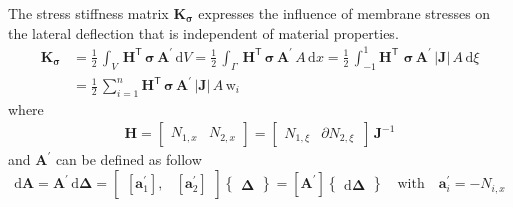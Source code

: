 The stress stiffness matrix $\mathbf{K}_{\boldsymbol{\sigma}}$ expresses the influence of membrane stresses on the lateral deflection that is independent of material properties.
\begin{equation}
\begin{aligned}
\mathbf{K}_{\boldsymbol{\sigma}} & = \frac{1}{2} \, \int_{V} \, \mathbf{H}^{\mathsf{T}} \, \boldsymbol{\sigma} \, \mathbf{A}^{'} \, \mathrm{d} V = \frac{1}{2} \, \int_{\Gamma} \, \mathbf{H}^{\mathsf{T}} \, \boldsymbol{\sigma} \, \mathbf{A}^{'} \, A \, \mathrm{d} x 
= \frac{1}{2} \, \int_{-1}^{1} \mathbf{H}^{\mathsf{T}} \,  \, \boldsymbol{\sigma} \, \mathbf{A}^{'} \, |\mathbf{J}|  \, A \,  \mathrm{d} \xi\\
& = \frac{1}{2} \, \sum_{i=1}^{n}  \mathbf{H}^{\mathsf{T}} \, \boldsymbol{\sigma} \, \mathbf{A}^{'}  \, |\mathbf{J}| \, A \, \mathrm{w}_i
\end{aligned}
\end{equation}
where 
\begin{equation}
\begin{aligned}
\mathbf{H} = \begin{bmatrix}
 N_{1,x} &  N_{2,x}
\end{bmatrix} = \begin{bmatrix}
 N_{1,\xi} &  \partial N_{2,\xi} \, 
\end{bmatrix} \, \mathbf{J}^{-1}
\end{aligned}
\end{equation}
and $\mathbf{A}^{'}$ can be defined as follow
\begin{equation}
\mathrm{d} \mathbf{A} = \mathbf{A}^{'} \, \mathrm{d} \boldsymbol{\Delta} = \begin{bmatrix}
[\mathbf{a}^{'}_1], & [\mathbf{a}^{'}_2]
\end{bmatrix}  \begin{Bmatrix} \boldsymbol{\Delta} \end{Bmatrix}  
= [\mathbf{A}^{'}] \begin{Bmatrix} \mathrm{d} \boldsymbol{\Delta} \end{Bmatrix} \quad \text{with} \quad \mathbf{a}^{'}_i = - N_{i,x}  
\end{equation}



